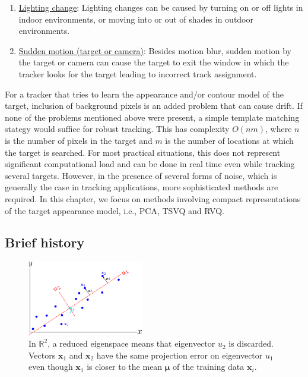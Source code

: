 \begin{Body}
\begin{enumerate}
\begin{enumerate}
\end{enumerate}
\item \underline{Lighting change}: Lighting changes can be caused by turning on or off lights in indoor environments, or moving into or out of shades in outdoor environments.
\item \underline{Sudden motion (target or camera)}:  Besides motion blur, sudden motion by the target or camera can cause the target to exit the window in which the tracker looks for the target leading to incorrect track assignment.
\end{enumerate}

For a tracker that tries to learn the appearance and/or contour model of the target, inclusion of background pixels is an added problem that can cause drift.  If none of the problems mentioned above were present, a simple template matching stategy would suffice for robust tracking.  This has complexity $O(nm)$, where $n$ is the number of pixels in the target and $m$ is the number of locations at which the target is searched.  For most practical situations, this does not represent significant computational load and can be done in real time even while tracking several targets.  However, in the presence of several forms of noise, which is generally the case in tracking applications, more sophisticated methods are required.  In this chapter, we focus on methods involving compact representations of the target appearance model, i.e., PCA, TSVQ and RVQ.



\subsection{Brief history}
								\begin{figure}[t]
								\centering
								\includegraphics[width=0.45\textwidth]{thesis/PRML_PCA_problem.pdf}
								\caption{In $\mathbb{R}^2$, a reduced eigenspace means that eigenvector $u_2$ is discarded.  Vectors $\mathbf{x}_1$ and $\mathbf{x}_2$ have the same projection error on eigenvector $u_1$ even though $\mathbf{x}_1$ is closer to the mean $\boldsymbol\mu$ of the training data $\mathbf{x}_i$.}
								\label{fig:PRML_PCA_problem}
								\end{figure}


\end{Body}
